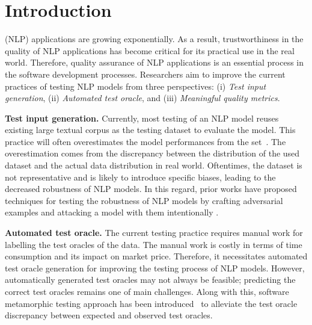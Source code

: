 \section{Introduction}
\label{sec:intro}



\Nlp (NLP) applications are growing exponentially.  As a result,
trustworthiness in the quality of NLP applications has become critical
for its practical use in the real world.  Therefore, quality assurance
of NLP applications is an essential process in the software
development processes.  Researchers aim to improve the current
practices of testing NLP models from three perspectives: (i)
\emph{Test input generation}, (ii) \emph{Automated test oracle}, and
(iii) \emph{Meaningful quality metrics}.

\noindent \textbf{Test input generation.} Currently, most testing of
an NLP model reuses existing large textual corpus as the testing
dataset to evaluate the model. This practice will often overestimates
the model performances from the \ho
set~\cite{patel2018mlevalforsoftware, recht2019imagenetbias,
  marcoACL2020checklist}.  The overestimation comes from the
discrepancy between the distribution of the used dataset and the
actual data distribution in real world. Oftentimes, the \ho dataset is
not representative and is likely to introduce specific biases, leading
to the decreased robustness of NLP models. In this regard, prior works
have proposed techniques for testing the robustness of NLP models by
crafting adversarial examples and attacking a model with them
intentionally \cite{ribeiro2018sear,belinkov2018breaknmt,
  rychalska2019wildnlp,iyyer2018adversarial}.

\noindent \textbf{Automated test oracle.} The current testing practice
requires manual work for labelling the test oracles of the \ho
data. The manual work is costly in terms of time consumption and its
impact on market price. Therefore, it necessitates automated test
oracle generation for improving the testing process of NLP models.
However, automatically generated test oracles may not always be
feasible; predicting the correct test oracles remains one of main
challenges. Along with this, software metamorphic testing approach has
been introduced~\cite{segura2016metamorphictest} to alleviate the test
oracle discrepancy between expected and observed test oracles.


